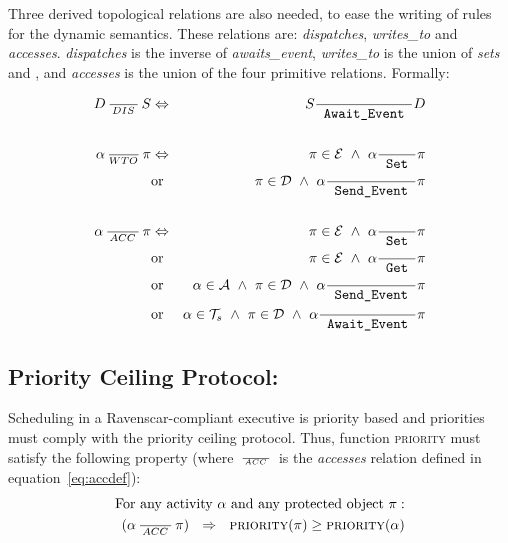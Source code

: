Three derived topological relations are also needed, to ease the
writing of rules for the dynamic semantics. These relations are:
\emph{dispatches}, \emph{writes\_to} and
\emph{accesses}. \emph{dispatches} is the inverse of
\emph{awaits\_event}, \emph{writes\_to} is the union of \emph{sets} and
, and \emph{accesses} is the union of the
four primitive relations. Formally:

\begin{eqnarray}
  D \RL{DIS} S & \Leftrightarrow & S \rgvt D \label{geinvd}\\
  \nonumber\\
  \alpha \RS{WTO} \pi & \Leftrightarrow & \pi \in {\cal E} \ \wedge \ \alpha \rset \pi\\ 
  \nonumber
  & \text{or} & \pi \in {\cal D} \ \wedge \ \alpha \rsvt \pi\\
  \nonumber \\
  \label{eq:accdef}
  \alpha \RL{ACC} \pi & \Leftrightarrow & 
  \pi \in {\cal E} \ \wedge \ \alpha \rset \pi\\
  \nonumber
  & \text{or} & \pi \in {\cal E} \ \wedge \ \alpha \rget \pi\\ 
  \nonumber 
  & \text{or} & \alpha \in {\cal A} \ \wedge \ \pi \in {\cal D} \ \wedge \ \alpha \rsvt \pi\\
  \nonumber 
  & \text{or} & \alpha \in {\cal T}_s \  \wedge \ \pi
  \in {\cal D} \ \wedge \ \alpha \rgvt \pi
\end{eqnarray}
 
\subsection{Priority Ceiling Protocol:}
Scheduling in a Ravenscar-compliant executive is priority based and
priorities must comply with the priority ceiling protocol. Thus,
function {\scshape priority} must satisfy the following property
(where $\,\frac{}{\,^{{ACC}}\,}\,$ is the \emph{accesses} relation defined in
equation~\ref{eq:accdef}):
\begin{eqnarray}
  \text{For any activity} \  \alpha \ \text{and any protected object} \ \pi: 
  \nonumber \\
  (\alpha \RL{ACC} \pi) \ \ 
  \Rightarrow \ \  \text{\scshape priority}(\pi) \geq \text{\scshape priority}(\alpha)
\end{eqnarray}

